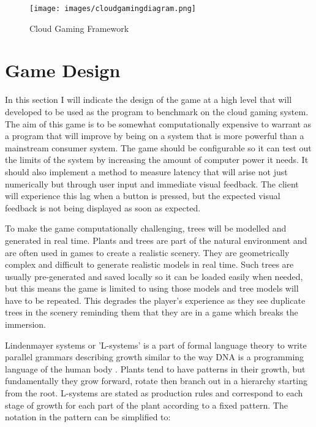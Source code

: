 \clearpage
\begin{figure}[h!]
 \centering
 \texttt{[image: images/cloudgamingdiagram.png]}
 \caption{Cloud Gaming Framework \cite{chuah2014cloud}}
 \label{fig:cloudframework}
\end{figure}

\section{Game Design}
In this section I will indicate the design of the game at a high level that will developed to be used as the program to benchmark on the cloud gaming system. The aim of this game is to be somewhat computationally expensive to warrant as a program that will improve by being on a system that is more powerful than a mainstream consumer system. The game should be configurable so it can test out the limits of the system by increasing the amount of computer power it needs. It should also implement a method to measure latency that will arise not just numerically but through user input and immediate visual feedback. The client will experience this lag when a button is pressed, but the expected visual feedback is not being displayed as soon as expected.
\newline
\par
To make the game computationally challenging, trees will be modelled and generated in real time. Plants and trees are part of the natural environment and are often used in games to create a realistic scenery. They are geometrically complex and difficult to generate realistic models in real time. Such trees are usually pre-generated and saved locally so it can be loaded easily when needed, but this means the game is limited to using those models and tree models will have to be repeated. This degrades the player's experience as they see duplicate trees in the scenery reminding them that they are in a game which breaks the immersion.
\newline
\par
Lindenmayer systems or 'L-systems' is a part of formal language theory to write parallel grammars describing growth similar to the way DNA is a programming language of the human body \cite{prusinkiewicz2012algorithmic}. Plants tend to have patterns in their growth, but fundamentally they grow forward, rotate then branch out in a hierarchy starting from the root. L-systems are stated as production rules and correspond to each stage of growth for each part of the plant according to a fixed pattern. The notation in the pattern can be simplified to:
